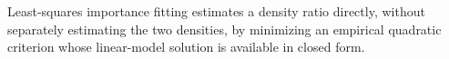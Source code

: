 Least-squares importance fitting estimates a density ratio directly, without separately estimating the two densities, by minimizing an empirical quadratic criterion whose linear-model solution is available in closed form.